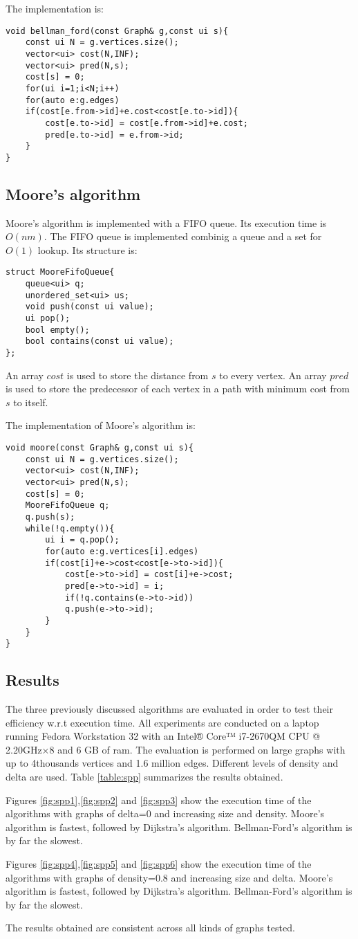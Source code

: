 The implementation is:
\begin{verbatim}
void bellman_ford(const Graph& g,const ui s){
	const ui N = g.vertices.size();
	vector<ui> cost(N,INF);
	vector<ui> pred(N,s);
	cost[s] = 0;
	for(ui i=1;i<N;i++)
	for(auto e:g.edges)
	if(cost[e.from->id]+e.cost<cost[e.to->id]){
		cost[e.to->id] = cost[e.from->id]+e.cost;
		pred[e.to->id] = e.from->id;
	}
}
\end{verbatim}

\subsection{Moore's algorithm}
Moore's algorithm is implemented with a FIFO queue. Its execution time is $O(nm)$.
The FIFO queue is implemented combinig a queue and a set for $O(1)$ lookup. Its structure is:
\begin{verbatim}
struct MooreFifoQueue{
	queue<ui> q;
	unordered_set<ui> us;
	void push(const ui value);
	ui pop();
	bool empty();
	bool contains(const ui value);
};
\end{verbatim}

An array $cost$ is used to store the distance from $s$ to every vertex.
An array $pred$ is used to store the predecessor of each vertex in a path with minimum cost from $s$ to itself.

The implementation of Moore's algorithm is:
\begin{verbatim}
void moore(const Graph& g,const ui s){
	const ui N = g.vertices.size();
	vector<ui> cost(N,INF);
	vector<ui> pred(N,s);
	cost[s] = 0;
	MooreFifoQueue q;
	q.push(s);
	while(!q.empty()){
		ui i = q.pop();
		for(auto e:g.vertices[i].edges)
		if(cost[i]+e->cost<cost[e->to->id]){
			cost[e->to->id] = cost[i]+e->cost;
			pred[e->to->id] = i;
			if(!q.contains(e->to->id))
			q.push(e->to->id);
		}
	}
}
\end{verbatim}

\subsection{Results}
The three previously discussed algorithms are evaluated in order to test their efficiency w.r.t execution time. All experiments are conducted on
a laptop running Fedora Workstation 32 with an Intel® Core™ i7-2670QM CPU @ 2.20GHz×8 and 6 GB of ram.
The evaluation is performed on large graphs with up to 4thousands vertices and 1.6 million edges. Different levels of density and delta are used.
Table \ref{table:spp} summarizes the results obtained.

Figures \ref{fig:spp1},\ref{fig:spp2} and \ref{fig:spp3} show the execution time of the algorithms
with graphs of delta=0 and increasing size and density.
Moore's algorithm is fastest, followed by Dijkstra's algorithm. Bellman-Ford's algorithm is by far the slowest.

Figures \ref{fig:spp4},\ref{fig:spp5} and \ref{fig:spp6} show the execution time of the algorithms
with graphs of density=0.8 and increasing size and delta.
Moore's algorithm is fastest, followed by Dijkstra's algorithm. Bellman-Ford's algorithm is by far the slowest.

The results obtained are consistent across all kinds of graphs tested.
